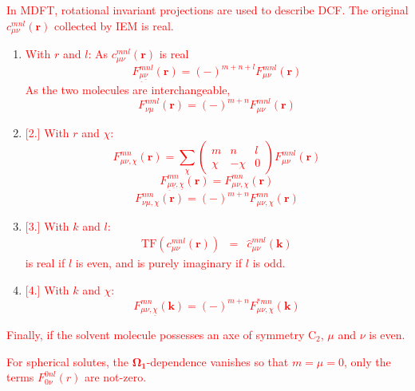 \textcolor{red}{In MDFT, rotational invariant projections are used
to describe DCF. The original $c_{\mu\nu}^{mnl}(\mathbf{r})$ collected
by IEM is real.}
\begin{enumerate}
\item \textcolor{red}{With $r$ and $l$: As $c_{\mu\nu}^{mnl}(\mathbf{r})$
is real
\begin{equation}
F_{\underline{\mu}\underline{\nu}}^{mnl}(\mathbf{r})=\left(-\right)^{m+n+l}F_{\mu\nu}^{mnl}(\mathbf{r})
\end{equation}
As the two molecules are interchangeable, 
\begin{equation}
F_{\nu\mu}^{nml}(\mathbf{r})=\left(-\right)^{m+n}F_{\mu\nu}^{mnl}(\mathbf{r})
\end{equation}
}
\item \textcolor{red}{%
[2.]%
With $r$ and $\chi$:
\begin{equation}
F_{\mu\nu,\chi}^{mn}(\mathbf{r})=\sum_{\chi}\left(\begin{array}{ccc}
m & n & l\\
\chi & -\chi & 0
\end{array}\right)F_{\mu\nu}^{mnl}(\mathbf{r})
\end{equation}
\begin{equation}
F_{\underline{\mu}\underline{\nu},\underline{\chi}}^{mn}(\mathbf{r})=F_{\mu\nu,\chi}^{mn}(\mathbf{r})
\end{equation}
\begin{equation}
F_{\nu\mu,\chi}^{nm}(\mathbf{r})=\left(-\right)^{m+n}F_{\mu\nu,\chi}^{mn}(\mathbf{r})
\end{equation}
}
\item \textcolor{red}{%
[3.]%
With $k$ and $l$:
\begin{eqnarray}
\mathrm{TF}(c_{\mu\nu}^{mnl}(\mathbf{r})) & = & \hat{c}_{\mu\nu}^{mnl}(\mathbf{k})
\end{eqnarray}
 is real if $l$ is even, and is purely imaginary if $l$ is odd.}
\item \textcolor{red}{%
[4.]%
With $k$ and $\chi$:
\begin{equation}
F_{\mu\nu,\underline{\chi}}^{mn}(\mathbf{k})=\left(-\right)^{m+n}F_{\mu\nu,\chi}^{*mn}(\mathbf{k})
\end{equation}
}
\end{enumerate}
\textcolor{red}{Finally, if the solvent molecule possesses an axe
of symmetry $\mathrm{C}_{2}$, $\mu$ and $\nu$ is even.}

\textcolor{red}{For spherical solutes, the $\mathbf{\Omega_{1}}$-dependence
vanishes so that $m=\mu=0$, only the terms $F_{0\nu}^{0nl}(r)$ are
not-zero.}
